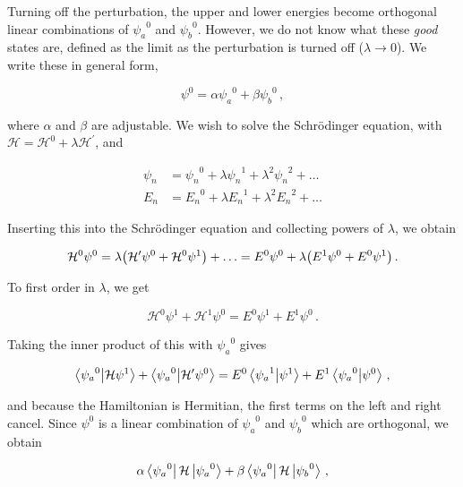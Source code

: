 \documentclass[12pt, titlepage]{article}
\begin{document}

Turning off the perturbation, the upper and lower energies become orthogonal linear combinations of ${\psi_a}^0$ and ${\psi_b}^0$. However, we do not know what these \textit{good} states are, defined as the limit as the perturbation is turned off ($\lambda \rightarrow 0$). We write these in general form,

\begin{equation}
	\psi^0 = \alpha{\psi_a}^0 + \beta{\psi_b}^0 \,,
\end{equation}

where $\alpha$ and $\beta$ are adjustable. We wish to solve the Schrödinger equation, with $\mathcal{H} = \mathcal{H}^0 + \lambda\mathcal{H}^\prime$, and 

\begin{align}
\psi_n &= {\psi_n}^0 + \lambda{\psi_n}^{1} + \lambda^2{\psi_n}^2 + \ldots \\[4pt]
E_n &= {E_n}^0 + \lambda{E_n}^{1} + \lambda^2{E_n}^2 + \ldots
\end{align}

Inserting this into the Schrödinger equation and collecting powers of $\lambda$, we obtain 

\begin{equation*}
	\mathcal{H}^0\psi^0 = \lambda\qty(\mathcal{H}^\prime\psi^0 + \mathcal{H}^0\psi^1) + \ldots = E^0\psi^0 + \lambda\qty(E^1\psi^0 + E^0\psi^1) \,.
\end{equation*}

To first order in $\lambda$, we get

\begin{equation}
	\mathcal{H}^0\psi^1 + \mathcal{H}^1\psi^0 = E^0\psi^1 + E^1\psi^0 \,.
\end{equation}

Taking the inner product of this with ${\psi_a}^0$ gives

\begin{equation*}
	\bra{{\psi_a}^0}\ket{\mathcal{H}\psi^1} + \bra{{\psi_a}^0}\ket{\mathcal{H}^\prime\psi^0} = E^0\bra{{\psi_a}^1}\ket{\psi^1} + E^1\bra{{\psi_a}^0}\ket{\psi^0} \,,
\end{equation*}

and because the Hamiltonian is Hermitian, the first terms on the left and right cancel. Since $\psi^0$ is a linear combination of ${\psi_a}^0$ and ${\psi_b}^0$ which are orthogonal, we obtain

\begin{equation}
	\alpha\bra{{\psi_a}^0}\mathcal{H}\ket{{\psi_a}^0} + \beta\bra{{\psi_a}^0}\mathcal{H}\ket{{\psi_b}^0} \,, 
\end{equation}
\end{document}

